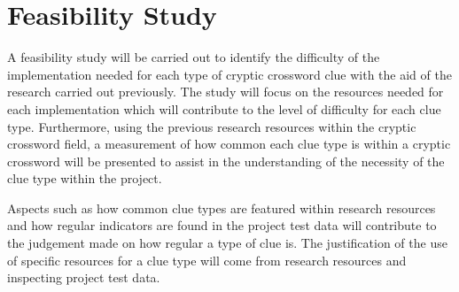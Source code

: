 \section{Feasibility Study}

A feasibility study will be carried out to identify the difficulty of the
implementation needed for each type of cryptic crossword clue with  the aid of
the research carried out previously. The study will focus  on the resources
needed for each implementation which will contribute  to the level of difficulty
for each clue type. Furthermore, using the  previous research resources within
the cryptic crossword field, a measurement  of how common each clue type is
within a cryptic crossword will be presented  to assist in the understanding of
the necessity of the clue type within the project.

Aspects such as how common clue types are featured within research  resources
and how regular indicators are found in the project test data  will contribute
to the judgement made on how regular a type of clue is. The  justification of
the use of specific resources for a clue type will come from  research resources
and inspecting project test data.

